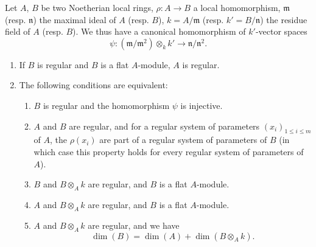 \begin{proposition}[17.3.3]
\label{0.17.3.3}
Let $A$, $B$ be two Noetherian local rings, $\rho:A\to B$ a local homomorphism, $\mathfrak{m}$ (resp. $\mathfrak{n}$) the maximal ideal of $A$ (resp. $B$), $k=A/\mathfrak{m}$ (resp. $k'=B/\mathfrak{n}$) the residue field of $A$ (resp. $B$).
We thus have a canonical homomorphism of $k'$-vector spaces
\[
\label{0.17.3.3.1}
  \psi:(\mathfrak{m}/\mathfrak{m}^2)\otimes_k k'\to\mathfrak{n}/\mathfrak{n}^2.
  \tag{17.3.3.1}
\]
\begin{enumerate}
  \item[{\rm(i)}] If $B$ is regular and $B$ is a flat $A$-module, $A$ is regular.
  \item[{\rm(ii)}] The following conditions are equivalent:
  \begin{enumerate}
    \item[{\rm a)}] $B$ is regular and the homomorphism $\psi$  is injective.
    \item[{\rm b)}] $A$ and $B$ are regular, and for a regular system of parameters $(x_i)_{1\leq i\leq m}$ of $A$, the $\rho(x_i)$ are part of a regular system of parameters of $B$ (in which case this property holds for every regular system of parameters of $A$).
    \item[{\rm c)}] $B$ and $B\otimes_A k$ are regular, and $B$ is a flat $A$-module.
    \item[{\rm d)}] $A$ and $B\otimes_A k$ are regular, and $B$ is a flat $A$-module.
    \item[{\rm e)}] $A$ and $B\otimes_A k$ are regular, and we have
    \[
    \label{0.17.3.3.2}
      \dim(B)=\dim(A)+\dim(B\otimes_A k).
      \tag{17.3.3.2}
    \]
  \end{enumerate}
\end{enumerate}
\end{proposition}

